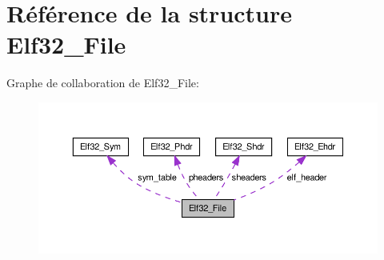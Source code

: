 \hypertarget{structElf32__File}{\section{Référence de la structure Elf32\-\_\-\-File}
\label{structElf32__File}
}


Graphe de collaboration de Elf32\-\_\-\-File\-:
\nopagebreak
\begin{figure}[H]
\begin{center}
\leavevmode
\includegraphics[width=350pt]{structElf32__File__coll__graph}
\end{center}
\end{figure}
